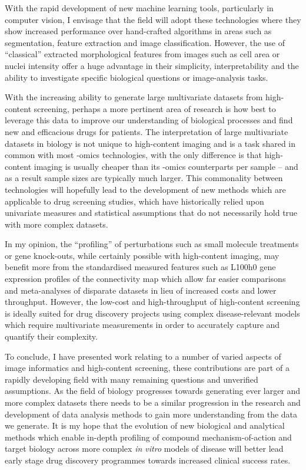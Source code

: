 \documentclass[a4paper,11pt,twoside,openright]{scrbook}
\begin{document}
With the rapid development of new machine learning tools, particularly in computer vision, I envisage that the field 
will adopt these technologies where they show increased performance over hand-crafted algorithms in areas such as 
segmentation, \cite{Ronneberger2015,Sadanandan2018} feature extraction \cite{Yosinski2014,Razavian2014} and image 
classification. \cite{Russakovsky2015}
However, the use of ``classical'' extracted morphological features from images such as cell area or nuclei intensity 
offer a huge advantage in their simplicity, interpretability and the ability to investigate specific biological 
questions or image-analysis tasks.

With the increasing ability to generate large multivariate datasets from high-content screening, perhaps a more 
pertinent area of research is how best to leverage this data to improve our understanding of biological processes and 
find new and efficacious drugs for patients.
The interpretation of large multivariate datasets in biology is not unique to high-content imaging and is a task shared 
in common with most -omics technologies, with the only difference is that high-content imaging is usually cheaper than 
its -omics counterparts per sample -- and as a result sample sizes are typically much larger.
This commonality between technologies will hopefully lead to the development of new methods which are applicable to 
drug screening studies, which have historically relied upon univariate measures and statistical assumptions that do not 
necessarily hold true with more complex datasets.

In my opinion, the ``profiling'' of perturbations such as small molecule treatments or gene knock-outs, while certainly 
possible with high-content imaging, may benefit more from the standardised measured features such as L100h0 gene 
expression profiles of the connectivity map \cite{Lamb2006,Subramanian2017} which allow far easier comparisons and 
meta-analyses of disparate datasets in lieu of increased costs and lower throughput.
However, the low-cost and high-throughput of high-content screening is ideally suited for drug discovery projects using 
complex disease-relevant models which require multivariate measurements in order to accurately capture and quantify 
their complexity.

To conclude, I have presented work relating to a number of varied aspects of image informatics and high-content 
screening, these contributions are part of a rapidly developing field with many remaining questions and unverified 
assumptions.
As the field of biology progresses towards generating ever larger and more complex datasets there needs to be a similar 
progression in the research and development of data analysis methods to gain more understanding from the data we 
generate.
It is my hope that the evolution of new biological and analytical methods which enable in-depth profiling of compound 
mechanism-of-action and target biology across more complex \textit{in vitro} models of disease will better lead early 
stage drug discovery programmes towards increased clinical success rates.
\end{document}
